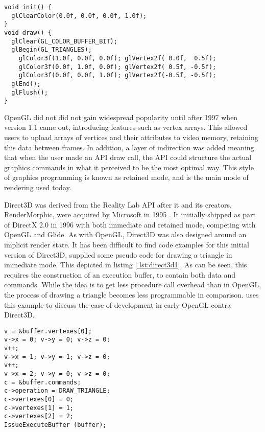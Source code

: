 \begin{lstlisting}[language={[ANSI]C}, caption={OpenGL 1.0 program written in C, that renders a triangle using immediate mode, with different colors for each point and linear interpolation between the colors. It is inspired by code examples from \citet{segal1994opengl}}, label={lst:opengl10}]
void init() {
  glClearColor(0.0f, 0.0f, 0.0f, 1.0f);
}
void draw() {
  glClear(GL_COLOR_BUFFER_BIT);
  glBegin(GL_TRIANGLES);
    glColor3f(1.0f, 0.0f, 0.0f); glVertex2f( 0.0f,  0.5f);
    glColor3f(0.0f, 1.0f, 0.0f); glVertex2f( 0.5f, -0.5f);
    glColor3f(0.0f, 0.0f, 1.0f); glVertex2f(-0.5f, -0.5f);
  glEnd();
  glFlush();
}
\end{lstlisting}


OpenGL did not did not gain widespread popularity until after 1997 when version 1.1 came out, introducing features such as vertex arrays\cite{kronos????history}.
This allowed users to upload arrays of vertices and their attributes to video memory, retaining this data between frames.  
In addition, a layer of indirection was added meaning that when the user made an \gls{API} draw call, the \gls{API} could structure the actual graphics commands in what it perceived to be the most optimal way. 
This style of graphics programming is known as retained mode, and is the main mode of rendering used today.


Direct3D was derived from the Reality Lab \gls{API} after it and its creators, RenderMorphic, were acquired by Microsoft in 1995 \cite{1997crushed}. 
It initially shipped as part of DirectX 2.0 in 1996 with both immediate and retained mode, competing with OpenGL and Glide\cite{wikipedia????directx}.
As with OpenGL, Direct3D was also designed around an implicit render state.
It has been difficult to find code examples for this initial version of Direct3D, \citet{carmack1996plan} supplied some pseudo code for drawing a triangle in immediate mode. This depicted in listing \ref{ lst:direct3d1}.
As can be seen, this requires the construction of an execution buffer, to contain both data and commands. 
While the idea is to get less procedure call overhead than in OpenGL, the process of drawing a triangle becomes less programmable in comparison. 
\citet{carmack1996plan} uses this example to discuss the ease of development in early OpenGL contra Direct3D. 


\begin{lstlisting}[language={[ANSI]C}, caption={Snippet of pseudocode for drawing a triangle  in Direct3D 1 using immediate mode. Note that this does not include the buffer setup. \cite{carmack1996plan} }, label={lst:direct3d1}]
v = &buffer.vertexes[0];
v->x = 0; v->y = 0; v->z = 0;
v++;
v->x = 1; v->y = 1; v->z = 0;
v++;
v->x = 2; v->y = 0; v->z = 0;
c = &buffer.commands;
c->operation = DRAW_TRIANGLE;
c->vertexes[0] = 0;
c->vertexes[1] = 1;
c->vertexes[2] = 2;
IssueExecuteBuffer (buffer);
\end{lstlisting}


